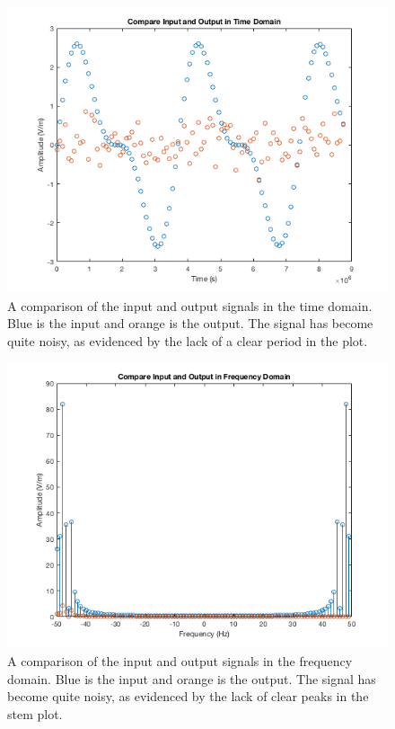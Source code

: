 \documentclass[11pt]{article}
\numberwithin{equation}{section}
\begin{document}
 \begin{figure}[ht]
 \begin{center}
     \includegraphics[width = 4.55in]{figs/time_domain_compare.png}
 \end{center}
 \caption{A comparison of the input and output signals in the time domain. Blue is the input and orange is the output. The signal has become quite noisy, as evidenced by the lack of a clear period in the plot.}
 \label{fig:time_dom} 
\end{figure}

 \begin{figure}[ht]
 \begin{center}
     \includegraphics[width = 4.55in]{figs/freq_domain_compare.png}
 \end{center}
 \caption{A comparison of the input and output signals in the frequency domain. Blue is the input and orange is the output. The signal has become quite noisy, as evidenced by the lack of clear peaks in the stem plot.}
 \label{fig:freq_dom} 
\end{figure} 
\end{document}
